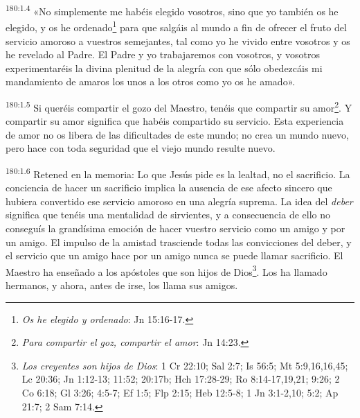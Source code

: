 \par 
\textsuperscript{180:1.4} «No simplemente me habéis elegido vosotros, sino que yo también os he elegido, y os he ordenado\footnote{\textit{Os he elegido y ordenado}: Jn 15:16-17.} para que salgáis al mundo a fin de ofrecer el fruto del servicio amoroso a vuestros semejantes, tal como yo he vivido entre vosotros y os he revelado al Padre. El Padre y yo trabajaremos con vosotros, y vosotros experimentaréis la divina plenitud de la alegría con que sólo obedezcáis mi mandamiento de amaros los unos a los otros como yo os he amado».

\par 
\textsuperscript{180:1.5} Si queréis compartir el gozo del Maestro, tenéis que compartir su amor\footnote{\textit{Para compartir el goz, compartir el amor}: Jn 14:23.}. Y compartir su amor significa que habéis compartido su servicio. Esta experiencia de amor no os libera de las dificultades de este mundo; no crea un mundo nuevo, pero hace con toda seguridad que el viejo mundo resulte nuevo.

\par 
\textsuperscript{180:1.6} Retened en la memoria: Lo que Jesús pide es la lealtad, no el sacrificio. La conciencia de hacer un sacrificio implica la ausencia de ese afecto sincero que hubiera convertido ese servicio amoroso en una alegría suprema. La idea del \textit{deber} significa que tenéis una mentalidad de sirvientes, y a consecuencia de ello no conseguís la grandísima emoción de hacer vuestro servicio como un amigo y por un amigo. El impulso de la amistad trasciende todas las convicciones del deber, y el servicio que un amigo hace por un amigo nunca se puede llamar sacrificio. El Maestro ha enseñado a los apóstoles que son hijos de Dios\footnote{\textit{Los creyentes son hijos de Dios}: 1 Cr 22:10; Sal 2:7; Is 56:5; Mt 5:9,16,16,45; Lc 20:36; Jn 1:12-13; 11:52; 20:17b; Hch 17:28-29; Ro 8:14-17,19,21; 9:26; 2 Co 6:18; Gl 3:26; 4:5-7; Ef 1:5; Flp 2:15; Heb 12:5-8; 1 Jn 3:1-2,10; 5:2; Ap 21:7; 2 Sam 7:14.}. Los ha llamado hermanos, y ahora, antes de irse, los llama sus amigos.

